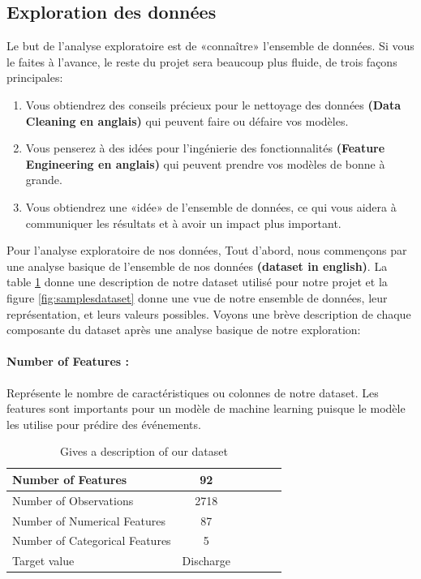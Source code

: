 \documentclass[12pt, french]{article}
\begin{document}
\subsection{Exploration des données}

Le but de l'analyse exploratoire est de «connaître» l'ensemble de données. Si vous le faites à l'avance, le reste du projet sera beaucoup plus fluide, de trois façons principales:
\begin{enumerate}
\item Vous obtiendrez des conseils précieux pour le nettoyage des données \textbf{(Data Cleaning en anglais)} qui peuvent faire ou défaire vos modèles.
\item Vous penserez à des idées pour l'ingénierie des fonctionnalités \textbf{(Feature Engineering en anglais)} qui peuvent prendre vos modèles de bonne à grande.
\item Vous obtiendrez une «idée» de l'ensemble de données, ce qui vous aidera à communiquer les résultats et à avoir un impact plus important.
\end{enumerate}

Pour l'analyse exploratoire de nos données, Tout d'abord, nous commençons par une analyse basique de l'ensemble de nos données \textbf{(dataset in english)}. La table \ref{tab:dataset} donne une description de notre dataset utilisé pour notre projet et la figure \ref{fig:samplesdataset} donne une vue de notre ensemble de données, leur représentation, et leurs valeurs possibles. Voyons une brève description de chaque composante du dataset après une analyse basique de notre exploration:

\paragraph{Number of Features :} Représente le nombre de caractéristiques ou colonnes de notre dataset. Les features sont importants pour un modèle de machine learning puisque le modèle les utilise pour prédire des événements. 



\begin{table}[h]
\centering
\begin{tabular}{|l|c|c|c|c|c|}
\hline
Number of Features & 92 \\
\hline
Number of Observations & 2718\\
\hline
Number of Numerical Features & 87\\
\hline
Number of Categorical Features & 5\\
\hline
Target value & Discharge\\
\hline

\end{tabular}
\caption{Gives a description of our dataset}
\label{tab:dataset}
\end{table}
\end{document}
